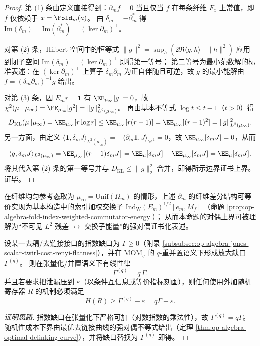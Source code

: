 \begin{proof}
第 (1) 条由定义直接得到：\(\partial_m f=0\) 当且仅当 \(f\) 在每条纤维 \(F_x\) 上常值，即 \(f\) 仅依赖于 \(x=\Fold_m(a)\)。
由 \(\delta_m=-\partial_m^\ast\) 得 \(\mathrm{Im}(\delta_m)=\mathrm{Im}(\partial_m^\ast)=(\ker\partial_m)^\perp\)。
\par
对第 (2) 条，Hilbert 空间中的恒等式
\(
\|g\|^2=\sup_{h}(2\Re\langle g,h\rangle-\|h\|^2)
\)
应用到闭子空间 \(\mathrm{Im}(\delta_m)=(\ker\partial_m)^\perp\) 即得第一等号；
第二等号为最小范数解的标准表述：在 \((\ker\partial_m)^\perp\) 上算子 \(\delta_m\partial_m\) 为正自伴随且可逆，故 \(g\) 的最小能解由 \(f=(\delta_m\partial_m)^{-1}g\) 给出。
\par
对第 (3) 条，因 \(E_m r=\mathbf 1\) 有 \(\EE_{\mu_\infty}[g]=0\)，故
\(
\chi^2(\mu\mid\mu_\infty)=\EE_{\mu_\infty}[g^2]=\|g\|_{L^2(\mu_\infty)}^2
\)。
再由基本不等式 \(\log t\le t-1\)（\(t>0\)）得
\[
D_{\mathrm{KL}}(\mu\|\mu_\infty)
=\EE_{\mu_\infty}[r\log r]
\le \EE_{\mu_\infty}[r(r-1)]
=\EE_{\mu_\infty}[(r-1)^2]
=\|g\|_{L^2(\mu_\infty)}^2.
\]
另一方面，由定义 \(\langle \mathbf 1,\delta_m J\rangle_{L^2(\mu_\infty)}=-\langle \partial_m\mathbf 1,J\rangle_{\mathcal H^1}=0\)，故 \(\EE_{\mu_\infty}[\delta_m J]=0\)，从而
\[
\langle g,\delta_m J\rangle_{L^2(\mu_\infty)}
=\EE_{\mu_\infty}\bigl[(r-1)\delta_m J\bigr]
=\EE_\mu[\delta_m J]-\EE_{\mu_\infty}[\delta_m J]
=\EE_\mu[\delta_m J].
\]
将其代入第 (2) 条的第一等号并与 \(D_{\mathrm{KL}}\le \|g\|_2^2\) 合并，即得所示边界证书上界。证毕。
\end{proof}

\begin{remark}\label{rem:xi-fiber-uniformization-stokes-stein-jones-commutator}
在纤维均匀参考态取为 \(\mu_\infty=\mathrm{Unif}(\Omega_m)\) 的情形，上述 \(\partial_m\) 的纤维差分结构可等价实现为基本构造中的索引加权交换子
\(
\mathrm{Ind}_{\mathrm W}(E_m)^{1/2}[e_m,M_f]
\)
（命题 \ref{prop:op-algebra-fold-index-weighted-commutator-energy}）；
从而本命题的对偶上界可被理解为“不可见 \(L^2\) 残差 \(\leftrightarrow\) 交换子能量”的强对偶证书化表述。
\end{remark}

\begin{corollary}\label{cor:xi-momq-gap-linear-amplification-randomness-cost}
设某一去耦/去链接接口的指数缺口为 \(\Gamma\ge 0\)（附录 \ref{subsubsec:op-algebra-jones-scalar-twirl-cost-renyi-flatness}），并在 \(\mathrm{MOM}_q\) 的 \(q\)-重并置语义下形成放大缺口 \(\Gamma^{(q)}\)。
则在张量化/并置语义下有线性律
\[
\boxed{\;\Gamma^{(q)}=q\,\Gamma.\;}
\]
并且若要求把泄漏压到 \(\varepsilon\)（以条件互信息或等价指标刻画），则任何使用外加随机寄存器 \(R\) 的机制必须满足
\[
\boxed{\;H(R)\ge \Gamma^{(q)}-\varepsilon=q\Gamma-\varepsilon.\;}
\]
\end{corollary}
\begin{proof}[证明思路]
指数缺口在张量化下严格可加（对数指数的乘法性），故 \(\Gamma^{(q)}=q\Gamma\)。
随机性成本下界由最优去链接曲线的强对偶不等式给出（定理 \ref{thm:op-algebra-optimal-delinking-curve}），并将缺口替换为 \(\Gamma^{(q)}\) 即得。
\end{proof}

